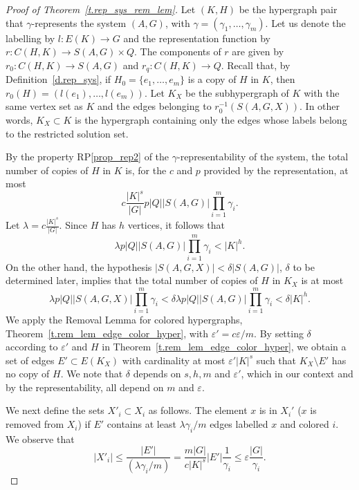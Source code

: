 \documentclass[10pt]{article}
\begin{document}
\begin{proof}[Proof of Theorem~\ref{t.rep_sys_rem_lem}]
	Let $(K,H)$ be the hypergraph pair that  $\gamma$-represents the system $(A,G)$, with $\gamma=(\gamma_1,\ldots,\gamma_m)$. Let us denote the labelling by $l:E(K)\to G$ and the representation function by
	$r:C(H,K)\to S(A,G)\times Q$.
The components of $r$ are given by $r_0:C(H,K)\to S(A,G)$ and $r_q:C(H,K)\to Q$. Recall that, by Definition~\ref{d.rep_sys}, if $H_0=\{e_1,\ldots,e_m\}$ is a copy of $H$ in $K$, then $r_0(H)=(l(e_1),\dots,l(e_m))$. 
	Let $K_X$ be the  subhypergraph of $K$ with the same vertex set as $K$ and the edges belonging to  $r_0^{-1}(S(A,G,X))$. In other words, $K_X\subset K$ is the hypergraph containing only the edges whose labels belong to the restricted solution set. 


By the property RP\ref{prop_rep2} of the $\gamma$-representability of the system, the total number of copies of $H$ in $K$ is, for the $c$ and $p$ provided by the representation, at most
	$$
	 c\frac{|K|^s}{ |G|} p |Q||S(A, G)| \prod_{i=1}^m \gamma_i.
	$$
	Let $\lambda=c\frac{|K|^s}{ |G|}$. 
	Since $H$ has $h$ vertices, it follows that
	$$
	 \lambda p  |Q| |S(A, G)| \prod_{i=1}^m \gamma_i<|K|^h.
	$$
	On the other hand, the hypothesis $|S(A,G,X)|<\delta |S(A,G)|$, $\delta$ to be determined later, implies that the total number of copies of $H$ in $K_X$ is at most
	$$
	\lambda p |Q| |S(A, G, X)| \prod_{i=1}^m \gamma_i < \delta\lambda p|Q| |S(A, G)| \prod_{i=1}^m \gamma_i < \delta |K|^h.
	$$
	We apply the Removal Lemma for colored hypergraphs, Theorem~\ref{t.rem_lem_edge_color_hyper}, with $\varepsilon'=c\varepsilon/m$. By setting $\delta$ according to $\varepsilon'$ and $H$ in Theorem~\ref{t.rem_lem_edge_color_hyper}, we obtain a set of edges $E'\subset  E(K_X)$ with cardinality  at most $\varepsilon'|K|^s$   such that $K_X \setminus E'$  has no copy of $H$. We note that $\delta$ depends on $s,h,m$ and $\varepsilon'$, which in our context and by the representability, all depend on $m$ and $\varepsilon$.

	We next define the sets $X'_i\subset X_i$ as follows. The element $x$ is in $X_i'$ ($x$ is removed from $X_i$) if $E'$ contains at least  $\lambda \gamma_i /m $ edges labelled $x$ and colored $i$. We observe that 
\begin{displaymath}
	|X'_i|\le \frac{|E'|}{(\lambda\gamma_i/m)}  =\frac{m|G|}{c|K|^s}|E'| \frac{1}{\gamma_i}\le \varepsilon \frac{|G|}{\gamma_i}.
\end{displaymath}


\end{proof}
\end{document}
